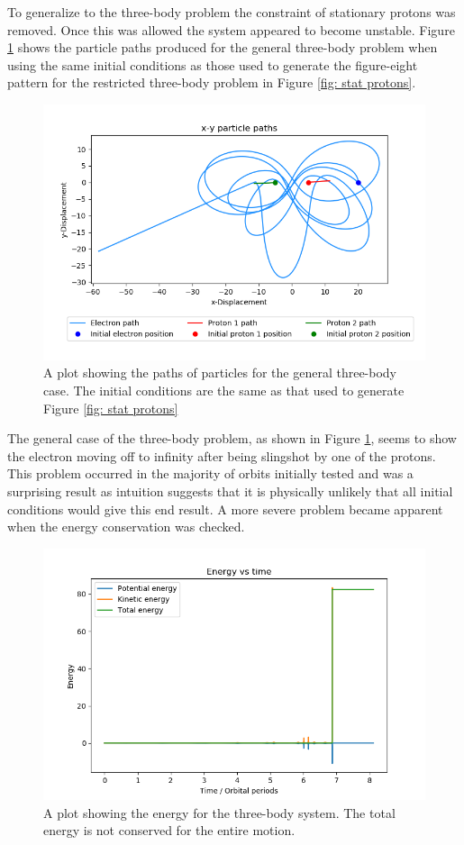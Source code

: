 \documentclass[12pt]{article} %
\numberwithin{equation}{subsection} %
\begin{document}
To generalize to the three-body problem the constraint of stationary protons was removed. Once this was allowed the system appeared to become unstable. Figure \ref{fig: mov protons} shows the particle paths produced for the general three-body problem when using the same initial conditions as those used to generate the figure-eight pattern for the restricted three-body problem in Figure \ref{fig: stat protons}. \par
\begin{figure}[h]
    \centering
    \captionsetup{justification=centering}
	\includegraphics[scale=0.45]{images/movPath2.png}
	\caption{A plot showing the paths of particles for the general three-body case. The initial conditions are the same as that used to generate Figure \ref{fig: stat protons}}
	\label{fig: mov protons}
	\end{figure}
The general case of the three-body problem, as shown in Figure \ref{fig: mov protons}, seems to show the electron moving off to infinity after being slingshot by one of the protons. This problem occurred in the majority of orbits initially tested and was a surprising result as intuition suggests that it is physically unlikely that all initial conditions would give this end result. A more severe problem became apparent when the energy conservation was checked. 
\begin{figure}[h]
    \centering
    \captionsetup{justification=centering}
	\includegraphics[scale=0.45]{images/unconservedEnergy2.png}
	\caption{A plot showing the energy for the three-body system. The total energy is not conserved for the entire motion.}
	\label{fig: unconserved energy} 
	\end{figure}
\end{document}

